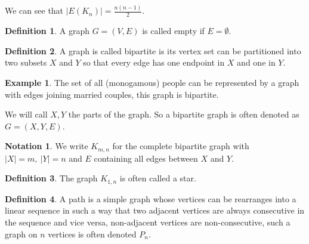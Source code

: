 \documentclass{article}
\theoremstyle{definition}
\newtheorem*{defn}{Definition}
\newtheorem*{ex}{Example}
\newtheorem*{nota}{Notation}
\begin{document}
We can see that $|E(K_n)| = \frac{n(n-1)}{2}$.
\begin{defn}
A graph $G=(V,E)$ is called empty if $E=\emptyset$.
\end{defn}

\begin{defn}
A graph is called bipartite is its vertex set can be partitioned into two subsets $X$ and $Y$ so that every edge has one endpoint in $X$ and one in $Y$.
\end{defn}

\begin{ex}
The set of all (monogamous) people can be represented by a graph with edges joining married couples, this graph is bipartite.
\end{ex}

We will call $X,Y$ the parts of the graph. So a bipartite graph is often denoted as $G = (X,Y,E)$.
\begin{nota}
We write $K_{m,n}$ for the complete bipartite graph with $|X| = m,\ |Y| = n$ and $E$ containing all edges between $X$ and $Y$.
\end{nota}

\begin{defn}
The graph $K_{1,n}$ is often called a star.
\end{defn}

\begin{defn}
A path is a simple graph whose vertices can be rearranges into a linear sequence in such a way that two adjacent vertices are always consecutive in the sequence and vice versa, non-adjacent vertices are non-consecutive, such a graph on $n$ vertices is often denoted $P_n$.
\end{defn}
\end{document}
